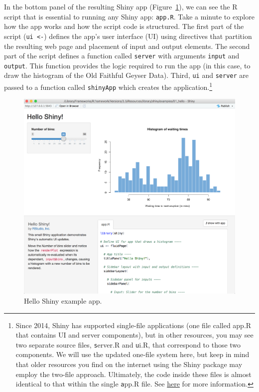 \documentclass[12pt,oneside]{book}\usepackage[]{graphicx}\usepackage[]{color}
\begin{document}
In the bottom panel of the resulting Shiny app (Figure~\ref{fig:hello}), we can see the R script that is essential to running any Shiny app: \verb+app.R+. Take a minute to explore how the app works and how the script code is structured. The first part of the script (\verb+ui <-+) defines the app's user interface (UI) using directives that partition the resulting web page and placement of input and output elements. The second part of the script defines a function called \verb+server+ with arguments \verb+input+ and \verb+output+. This function provides the logic required to run the app (in this case, to draw the histogram of the Old Faithful Geyser Data). Third, \verb+ui+ and \verb+server+ are passed to a function called \verb+shinyApp+ which creates the application.\footnote{Since 2014, Shiny has supported single-file applications (one file called app.R that contains UI and server components), but in other resources, you may see two separate source files, {\texttt server.R} and {\texttt ui.R}, that correspond to those two components. We will use the updated one-file system here, but keep in mind that older resources you find on the internet using the Shiny package may employ the two-file approach. Ultimately, the code inside these files is almost identical to that within the single {\texttt app.R} file. See \href{https://shiny.rstudio.com/articles/app-formats.html}{here} for more information.}

\begin{figure}[htbp]
\includegraphics[width=5.5in]{09-shiny/09-images/hello_shiny.png}
\centering
\caption{Hello Shiny example app.}
\label{fig:hello}
\end{figure}
\end{document}
